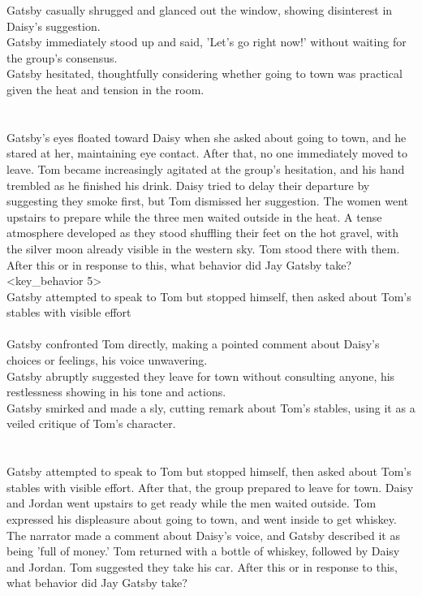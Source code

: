\begin{tcolorbox}[title = {Behavior Chain}, breakable]
Gatsby casually shrugged and glanced out the window, showing disinterest in Daisy's suggestion.\\
Gatsby immediately stood up and said, 'Let’s go right now!' without waiting for the group’s consensus.\\
Gatsby hesitated, thoughtfully considering whether going to town was practical given the heat and tension in the room.\\
\\<context 5>\\
Gatsby's eyes floated toward Daisy when she asked about going to town, and he stared at her, maintaining eye contact. After that, no one immediately moved to leave. Tom became increasingly agitated at the group's hesitation, and his hand trembled as he finished his drink. Daisy tried to delay their departure by suggesting they smoke first, but Tom dismissed her suggestion. The women went upstairs to prepare while the three men waited outside in the heat. A tense atmosphere developed as they stood shuffling their feet on the hot gravel, with the silver moon already visible in the western sky. Tom stood there with them. After this or in response to this, what behavior did Jay Gatsby take?
\\<key\_behavior 5>\\
Gatsby attempted to speak to Tom but stopped himself, then asked about Tom's stables with visible effort
\\<distracters 5>\\
Gatsby confronted Tom directly, making a pointed comment about Daisy's choices or feelings, his voice unwavering.\\
Gatsby abruptly suggested they leave for town without consulting anyone, his restlessness showing in his tone and actions.\\
Gatsby smirked and made a sly, cutting remark about Tom's stables, using it as a veiled critique of Tom's character.\\
\\<context 6>\\
Gatsby attempted to speak to Tom but stopped himself, then asked about Tom's stables with visible effort. After that, the group prepared to leave for town. Daisy and Jordan went upstairs to get ready while the men waited outside. Tom expressed his displeasure about going to town, and went inside to get whiskey. The narrator made a comment about Daisy's voice, and Gatsby described it as being 'full of money.' Tom returned with a bottle of whiskey, followed by Daisy and Jordan. Tom suggested they take his car. After this or in response to this, what behavior did Jay Gatsby take?

\end{tcolorbox}
